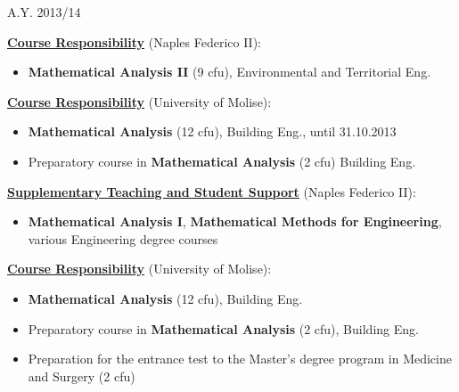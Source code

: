 \documentclass[11pt,a4paper,sans,colorlinks,linkcolor=green]{moderncv}
\begin{document}
   {A.Y. 2013/14}{\textbf{\underline{Course Responsibility}} (Naples Federico II):
\begin{itemize}    \item \textbf{Mathematical Analysis II} (9 cfu), Environmental and Territorial Eng.
  \end{itemize}
       \vspace{-.05cm}
\textbf{\underline{Course Responsibility}} (University of Molise):
\begin{itemize}    \item \textbf{Mathematical Analysis} (12 cfu),  Building Eng., until 31.10.2013
  \item Preparatory course in \textbf{Mathematical Analysis} (2 cfu) Building Eng.
  \end{itemize}
        \vspace{-.05cm}
\textbf{\underline{Supplementary Teaching and Student Support}} (Naples Federico II):
\begin{itemize}    \item \textbf{Mathematical Analysis
    I}, \textbf{Mathematical Methods for Engineering}, various Engineering degree courses
\end{itemize}
  \vspace{-.6cm}\phantom{x}
}
  {
\textbf{\underline{Course Responsibility}} (University of Molise):
\begin{itemize}    \item \textbf{Mathematical Analysis} (12 cfu),  Building Eng.
  \item Preparatory course in \textbf{Mathematical Analysis} (2 cfu),  Building Eng.
  \item Preparation for the entrance test to the Master's degree program in Medicine and Surgery (2 cfu)
  \end{itemize}
     \vspace{-.6cm}\phantom{x}
   }
\end{document}
